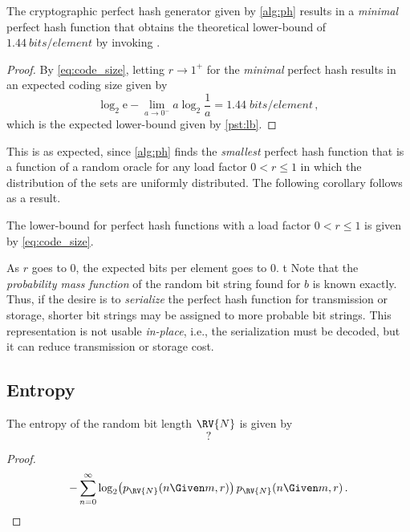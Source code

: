 \documentclass[ ../main.tex]{subfiles}
\begin{document}
\begin{theorem}
The cryptographic perfect hash generator given by \cref{alg:ph} results in a \emph{minimal} perfect hash function that obtains the theoretical lower-bound of $\SI{1.44}{bits \per element}$ by invoking .
\end{theorem}
\begin{proof}
By \cref{eq:code_size}, letting $r \to 1^{+}$ for the \emph{minimal} perfect hash results in an expected coding size given by
\begin{equation}
    \log_2 \mathrm{e} - \lim_{a \to 0^{-}} a \log_2 \frac{1}{a} = 1.44 \; \si{bits \per element}\,,
\end{equation}
which is the expected lower-bound given by \cref{pst:lb}.
\end{proof}
This is as expected, since \cref{alg:ph} finds the \emph{smallest} perfect hash function that is a function of a random oracle for any load factor $0 < r \leq 1$ in which the distribution of the sets are uniformly distributed. The following corollary follows as a result.
\begin{corollary}
The lower-bound for perfect hash functions with a load factor $0 < r \leq 1$ is given by \cref{eq:code_size}.
\end{corollary}
As $r$ goes to $0$, the expected bits per element goes to $0$.
t
Note that the \emph{probability mass function} of the random bit string found for $b$ is known exactly. Thus, if the desire is to \emph{serialize} the perfect hash function for transmission or storage, shorter bit strings may be assigned to more probable bit strings. This representation is not usable \emph{in-place}, i.e., the serialization must be decoded, but it can reduce transmission or storage cost.

\subsection{Entropy}

The entropy of the random bit length $\RV{N}$ is given by
\begin{equation}
?    
\end{equation}
\begin{proof}
\begin{align}
    -\sum_{n=0}^{\infty} \log_2\!\left(\pmf_{\RV{N}}(n \Given m,r)\right) \pmf_{\RV{N}}(n \Given m,r)\,.
\end{align}
\end{proof}
\end{document}
